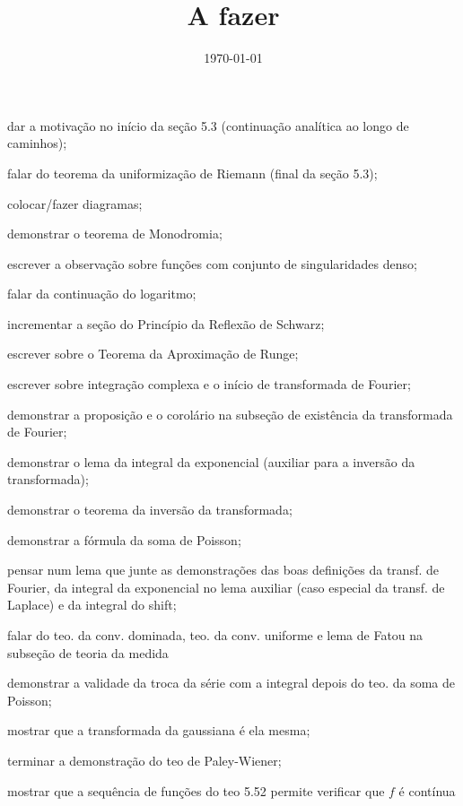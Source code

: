 \documentclass[12pt,a4paper]{article}
\title{A fazer}
\author{}
\date{\today}
\newcommand{\cmark}{\ding{51}}%
\newcommand{\done}{\rlap{$\square$}{\raisebox{2pt}{\large\hspace{1pt}\cmark}}%
\hspace{-2.5pt}}
\begin{document}
\maketitle

\begin{todolist}
    \item dar a motivação no início da seção 5.3 (continuação analítica ao longo
    de caminhos);
    \item falar do teorema da uniformização de Riemann (final da seção 5.3); 
    \item colocar/fazer diagramas;
    \item[\done] demonstrar o teorema de Monodromia;
    \item[\done] escrever a observação sobre funções com conjunto de singularidades denso;
    \item[\done] falar da continuação do logaritmo;
    \item[\done] incrementar a seção do Princípio da Reflexão de Schwarz;
    \item[\done] escrever sobre o Teorema da Aproximação de Runge;
    \item[\done] escrever sobre integração complexa e o início de transformada de Fourier;
    \item[\done] demonstrar a proposição e o corolário na subseção de existência da transformada de Fourier;
    \item[\done] demonstrar o lema da integral da exponencial (auxiliar para a inversão da transformada);
    \item[\done] demonstrar o teorema da inversão da transformada;
    \item[\done] demonstrar a fórmula da soma de Poisson;
    \item pensar num lema que junte as demonstrações das boas definições da transf. de Fourier,
          da integral da exponencial no lema auxiliar (caso especial da transf. de Laplace) e
          da integral do shift;
    \item falar do teo. da conv. dominada, teo. da conv. uniforme e lema de
    Fatou na subseção de teoria da medida
    \item demonstrar a validade da troca da série com a integral depois do teo. da soma de Poisson;
    \item[\done] mostrar que a transformada da gaussiana é ela mesma;
    \item terminar a demonstração do teo de Paley-Wiener;
    \item mostrar que a sequência de funções do teo 5.52 permite verificar
    que $f$ é contínua

\end{todolist}
\end{document}

